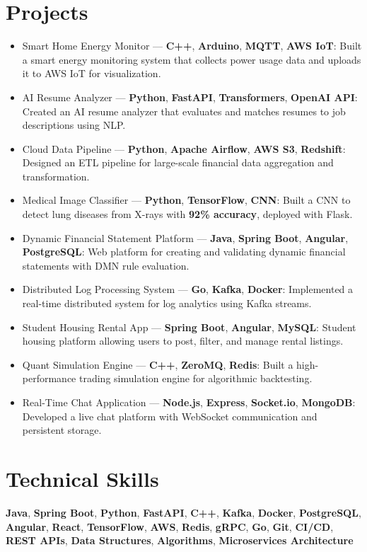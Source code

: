 \documentclass[letterpaper,11pt]{article}
\newcommand{\resumeItem}[1]{
    \item\small{
            {#1 \vspace{-2pt}}
    }
}
\newcommand{\resumeSubHeadingListStart}{\begin{itemize}[leftmargin=0.15in, label={}]}
\newcommand{\resumeSubHeadingListEnd}{\end{itemize}}
\begin{document}
\section{Projects}
\resumeSubHeadingListStart
\resumeItem{Smart Home Energy Monitor — \textbf{C++}, \textbf{Arduino}, \textbf{MQTT}, \textbf{AWS IoT}: Built a smart energy monitoring system that collects power usage data and uploads it to AWS IoT for visualization.}
\resumeItem{AI Resume Analyzer — \textbf{Python}, \textbf{FastAPI}, \textbf{Transformers}, \textbf{OpenAI API}: Created an AI resume analyzer that evaluates and matches resumes to job descriptions using NLP.}
\resumeItem{Cloud Data Pipeline — \textbf{Python}, \textbf{Apache Airflow}, \textbf{AWS S3}, \textbf{Redshift}: Designed an ETL pipeline for large-scale financial data aggregation and transformation.}
\resumeItem{Medical Image Classifier — \textbf{Python}, \textbf{TensorFlow}, \textbf{CNN}: Built a CNN to detect lung diseases from X-rays with \textbf{92\% accuracy}, deployed with Flask.}
\resumeItem{Dynamic Financial Statement Platform — \textbf{Java}, \textbf{Spring Boot}, \textbf{Angular}, \textbf{PostgreSQL}: Web platform for creating and validating dynamic financial statements with DMN rule evaluation.}
\resumeItem{Distributed Log Processing System — \textbf{Go}, \textbf{Kafka}, \textbf{Docker}: Implemented a real-time distributed system for log analytics using Kafka streams.}
\resumeItem{Student Housing Rental App — \textbf{Spring Boot}, \textbf{Angular}, \textbf{MySQL}: Student housing platform allowing users to post, filter, and manage rental listings.}
\resumeItem{Quant Simulation Engine — \textbf{C++}, \textbf{ZeroMQ}, \textbf{Redis}: Built a high-performance trading simulation engine for algorithmic backtesting.}
\resumeItem{Real-Time Chat Application — \textbf{Node.js}, \textbf{Express}, \textbf{Socket.io}, \textbf{MongoDB}: Developed a live chat platform with WebSocket communication and persistent storage.}
\resumeSubHeadingListEnd

\section{Technical Skills}
\begin{itemize}[leftmargin=0.15in, label={}]
\small{\item{
\textbf{Java}, \textbf{Spring Boot}, \textbf{Python}, \textbf{FastAPI}, \textbf{C++}, \textbf{Kafka}, \textbf{Docker}, \textbf{PostgreSQL}, \textbf{Angular}, \textbf{React}, \textbf{TensorFlow}, \textbf{AWS}, \textbf{Redis}, \textbf{gRPC}, \textbf{Go}, \textbf{Git}, \textbf{CI/CD}, \textbf{REST APIs}, \textbf{Data Structures}, \textbf{Algorithms}, \textbf{Microservices Architecture}
}}
\end{itemize}
\end{document}
